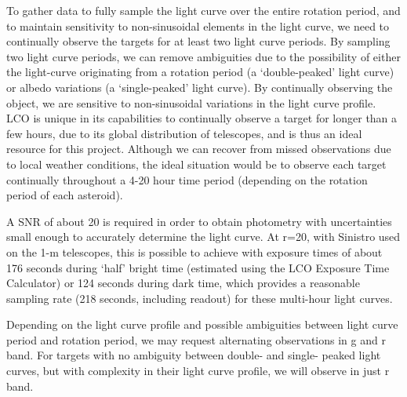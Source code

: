 \documentclass[11pt]{article}
\begin{document}
To gather data to fully sample the light curve over the entire rotation
period, and to maintain sensitivity to non-sinusoidal elements in the
light curve, we need to continually observe the targets for at least
two light curve periods. By sampling two light curve periods, we can
remove ambiguities due to the possibility of either the light-curve
originating from a rotation period (a `double-peaked' light curve) or
albedo variations (a `single-peaked' light curve).  By continually
observing the object, we are sensitive to non-sinusoidal variations in
the light curve profile. LCO is unique in its capabilities to
continually observe a target for longer than a few hours, due to its
global distribution of telescopes, and is thus an ideal resource for
this project. Although we can recover from missed observations due to
local weather conditions, the ideal situation would be to observe each
target continually throughout a 4-20 hour time period (depending on the
rotation period of each asteroid). 

A SNR of about 20 is required in order to obtain photometry with
uncertainties small enough to accurately determine the light curve. At
r=20, with Sinistro used on the 1-m telescopes, this is possible to
achieve with exposure times of about 176 seconds during `half' bright
time (estimated using the LCO Exposure Time Calculator) or 124 seconds
during dark time, which provides a reasonable sampling rate (218
seconds, including readout) for these multi-hour light curves. 

Depending on the light curve profile and possible ambiguities between
light curve period and rotation period, we may request alternating
observations in g and r band. For targets with no ambiguity between
double- and single- peaked light curves, but with complexity in their
light curve profile, we will observe in just r band.


% 

\end{document}
